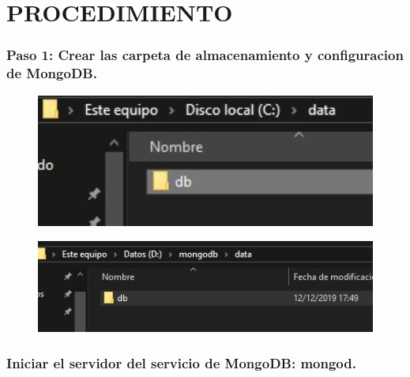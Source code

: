 \documentclass[preprint,12pt]{elsarticle}
\begin{document}
\section{PROCEDIMIENTO}

\subsubsection{\textbf{Paso 1: Crear las carpeta de almacenamiento y configuracion de MongoDB.}}
\begin{figure}[H]
	\begin{center}
		\includegraphics[width=12cm]{./IMAGENES/1} 
	\end{center}
\end{figure}
\begin{figure}[H]
	\begin{center}
		\includegraphics[width=12cm]{./IMAGENES/2} 
	\end{center}
\end{figure}

\subsubsection{\textbf{Iniciar el servidor del servicio de MongoDB: mongod.}}
\end{document}
